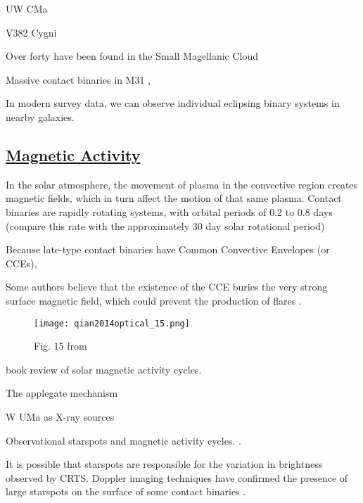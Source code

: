 \documentclass[12pt]{article} %
\numberwithin{equation}{section} %
\begin{document}
UW CMa \citep{antokhina2011light}

V382 Cygni \citep{popper1978masses}

Over forty have been found in the Small Magellanic Cloud \citep{hilditch2005forty}

Massive contact binaries in M31 \citep{lee2014properties}, \citep{vilardell2006eclipsing}

In modern survey data, we can observe individual eclipsing binary systems in nearby galaxies.



\subsection[Magnetic Activity]{\hyperlink{toc}{Magnetic Activity}}

In the solar atmosphere, the movement of plasma in the convective region creates magnetic fields, which in turn affect the motion of that same plasma. Contact binaries are rapidly rotating systems, with orbital periods of 0.2 to 0.8 days (compare this rate with the approximately 30 day solar rotational period)

 Because late-type contact binaries have Common Convective Envelopes (or CCEs), 

Some authors believe that the existence of the CCE buries the very strong surface magnetic field, which could prevent the production of flares \citep{qian2014optical}. 

\begin{figure}[H]
\centering
\texttt{[image: qian2014optical\_15.png]}
\caption{Fig. 15 from \citet{qian2014optical}}
\label{fig: qian2014optical_15}
\end{figure}

\citep{balogh2015solar} book review of solar magnetic activity cycles.

The applegate mechanism \citep{applegate1992mechanism} \citep{lanza2006internal}

W UMa as X-ray sources \citep{stepien2001rosat}

Observational starspots and magnetic activity cycles.  \citep{borkovits2005indirect,qian2000possible,kaszas1998period,qian2007ad,lee2004period,yang2012deep,zhang2004long}.

It is possible that starspots are responsible for the variation in brightness observed by CRTS. Doppler imaging techniques have confirmed the presence of large starspots on the surface of some contact binaries \citep{barnes2004high}. 
\end{document}
